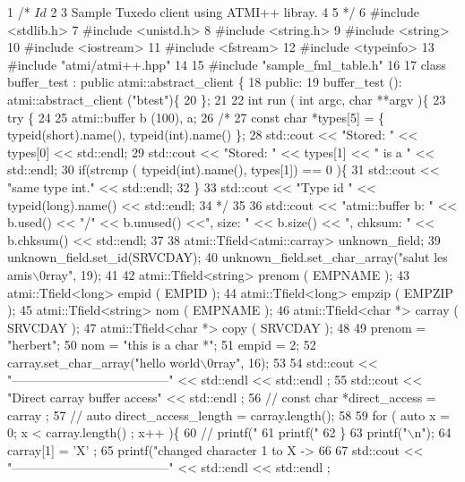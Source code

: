 \begin{DoxyCodeInclude}
1 /* $Id$
2 
3    Sample Tuxedo client using ATMI++ libray.
4 
5  */
6 #include <stdlib.h>
7 #include <unistd.h>
8 #include <string.h>
9 #include <string>
10 #include <iostream>
11 #include <fstream>
12 #include <typeinfo>
13 #include "atmi/atmi++.hpp"
14 
15 #include "sample\_fml\_table.h"
16 
17 class buffer\_test : public atmi::abstract\_client \{
18   public:
19     buffer\_test (): atmi::abstract\_client ("btest")\{
20     \};
21 
22     int run ( int argc, char **argv )\{
23       try \{
24 
25         atmi::buffer b (100), a;
26         /*
27            const char *types[5] = \{ typeid(short).name(), typeid(int).name() \};
28            std::cout << "Stored: " << types[0] << std::endl;
29            std::cout << "Stored: " << types[1] << " is a " << std::endl;
30            if(strcmp ( typeid(int).name(), types[1]) == 0 )\{
31            std::cout << "same type int." << std::endl;
32            \}
33            std::cout << "Type id " << typeid(long).name() << std::endl;
34          */
35 
36         std::cout << "atmi::buffer b: " << b.used() << "/" << b.unused() <<", size: " << b.size() << ",
       chksum: " << b.chksum() <<  std::endl;
37 
38         atmi::Tfield<atmi::carray>   unknown\_field;
39         unknown\_field.set\_id(SRVCDAY);
40         unknown\_field.set\_char\_array("salut les amis\(\backslash\)0rray", 19);
41 
42         atmi::Tfield<string> prenom ( EMPNAME );
43         atmi::Tfield<long>   empid ( EMPID );
44         atmi::Tfield<long>   empzip ( EMPZIP );
45         atmi::Tfield<string> nom ( EMPNAME );
46         atmi::Tfield<char *> carray ( SRVCDAY );
47         atmi::Tfield<char *> copy ( SRVCDAY );
48 
49         prenom = "herbert";
50         nom = "this is a char *";
51         empid = 2;
52         carray.set\_char\_array("hello world\(\backslash\)0rray", 16);
53 
54         std::cout << "--------------------------------------" << std::endl << std::endl ;
55         std::cout << "Direct carray buffer access" << std::endl ;
56         // const char *direct\_access = carray ;
57         // auto direct\_access\_length = carray.length();
58 
59         for ( auto x = 0; x < carray.length() ; x++ )\{
60           // printf("%
61           printf("%
62         \}
63         printf("\(\backslash\)n");
64         carray[1] = 'X' ;
65         printf("changed character 1 to X -> %
66 
67         std::cout << "--------------------------------------" << std::endl << std::endl ;

\end{DoxyCodeInclude}
